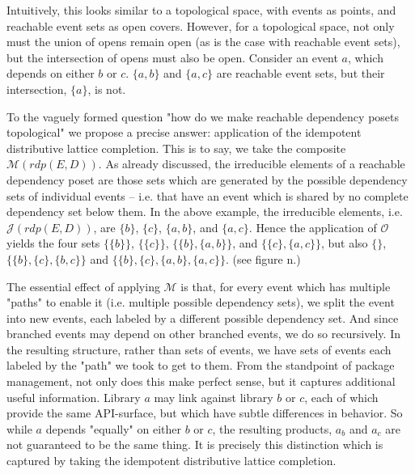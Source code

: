 \documentclass[hoptionsi,review,format=sigplan]{acmart}
\theoremstyle{definition}
\newcommand{\Mcc}{\mathcal{M}}
\newcommand{\Oc}{\mathcal{O}}
\newcommand{\Jc}{\mathcal{J}}
\begin{document}
Intuitively, this looks similar to a topological space, with events as points, and reachable event sets as open covers. However, for a topological space, not only must the union of opens remain open (as is the case with reachable event sets), but the intersection of opens must also be open. Consider an event \(a\), which depends on either \(b\) or \(c\). \(\{a,b\}\) and  \(\{a,c\}\) are reachable event sets, but their intersection, \(\{a\}\), is not.

To the vaguely formed question "how do we make reachable dependency posets topological" we propose a precise answer: application of the idempotent distributive lattice completion. This is to say, we take the composite \(\Mcc(rdp(E,D))\). As already discussed, the irreducible elements of a reachable dependency poset are those sets which are generated by the possible dependency sets of individual events -- i.e. that have an event which is shared by no complete dependency set below them. In the above example, the irreducible elements, i.e. \(\Jc(rdp(E,D))\), are \(\{b\}\), \(\{c\}\), \(\{a,b\}\), and \(\{a,c\}\). Hence the application of \(\Oc\) yields the four sets \(\{\{b\}\}\), \(\{\{c\}\}\), \(\{\{b\},\{a,b\}\}\), and \(\{\{c\},\{a,c\}\}\), but also \(\{\}\), \(\{\{b\},\{c\},\{b,c\}\}\) and \(\{\{b\},\{c\},\{a,b\},\{a,c\}\}\). (see figure n.)




The essential effect of applying \(\Mcc\) is that, for every event which has multiple "paths" to enable it (i.e. multiple possible dependency sets), we split the event into new events, each labeled by a different possible dependency set. And since branched events may depend on other branched events, we do so recursively. In the resulting structure, rather than sets of events, we have sets of events each labeled by the "path" we took to get to them. From the standpoint of package management, not only does this make perfect sense, but it captures additional useful information. Library \(a\) may link against library \(b\) or \(c\), each of which provide the same API-surface, but which have subtle differences in behavior. So while \(a\) depends "equally" on either \(b\) or \(c\), the resulting products, \(a_b\) and \(a_c\) are not guaranteed to be the same thing. It is precisely this distinction which is captured by taking the idempotent distributive lattice completion.
\end{document}
